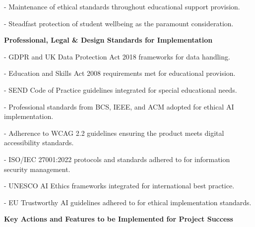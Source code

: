 \documentclass[14pt,a4paper]{article}
\begin{document}
- Maintenance of ethical standards throughout educational support provision.

- Steadfast protection of student wellbeing as the paramount consideration.

\begin{center}
\textbf{Professional, Legal \& Design Standards for Implementation}
\end{center}


- GDPR and UK Data Protection Act 2018 frameworks for data handling.

- Education and Skills Act 2008 requirements met for educational provision.

- SEND Code of Practice guidelines integrated for special educational needs.

- Professional standards from BCS, IEEE, and ACM adopted for ethical AI implementation.

- Adherence to WCAG 2.2 guidelines ensuring the product meets digital accessibility standards.

- ISO/IEC 27001:2022 protocols and standards adhered to for information security management.

- UNESCO AI Ethics frameworks integrated for international best practice.

- EU Trustworthy AI guidelines adhered to for ethical implementation standards.



\begin{center}
\textbf{Key Actions and Features to be Implemented for Project Success}
\end{center}
\end{document}
